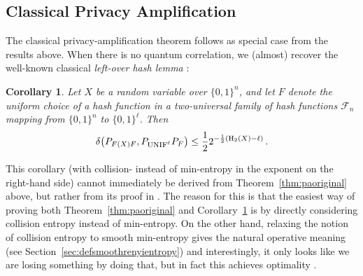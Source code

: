 \documentclass[final,11pt,a4paper]{report}
\newtheorem{corollary}[theorem]{Corollary}
\newcommand*{\unif}{\mbox{\sc unif}}
\newcommand*{\nbit}{\set{0,1}^n}
\newcommand*{\set}[1]{\{#1\}}          %
\renewcommand*{\H}{\operatorname{H}}   %
\newcommand*{\dist}[1]{\delta\big(#1\big)}  %
\newcommand*{\chf}[1]{\ensuremath{\mathcal{F}_{#1}}} %
\begin{document}
\subsection{Classical Privacy Amplification}
The classical privacy-amplification theorem follows as special case
from the results above. When there is no quantum correlation, we
(almost) recover the well-known classical \emph{left-over hash lemma}
\cite{ILL89, BBCM95, HILL99}:
\begin{corollary}\label{thm:classicalpa}
  Let $X$ be a random variable over $\nbit$, and let $F$ denote the
  uniform choice of a hash function in a two-universal family of
  hash functions $\chf{n}$ mapping from $\nbit$ to $\set{0,1}^{\ell}$. Then
\[\dist{ P_{F(X) F},P_{\unif^{\ell}} P_{F} } \leq
  \frac12 2^{-\frac12(\H_2(X) - \ell)} \, .\]
\end{corollary}
This corollary (with collision- instead of min-entropy in the exponent
on the right-hand side) cannot immediately be derived from
Theorem~\ref{thm:paoriginal} above, but rather from its proof in
\cite{Renner05}. The reason for this is that the easiest way of
proving both Theorem~\ref{thm:paoriginal} and
Corollary~\ref{thm:classicalpa} is by directly considering collision
entropy instead of
min-entropy. On the other hand, relaxing the
notion of collision entropy to smooth min-entropy gives the natural
operative meaning (see Section~\ref{sec:defsmoothrenyientropy}) and
interestingly, it only looks like we are losing something by doing
that, but in fact this achieves optimality \cite{RW05}.




\end{document}
